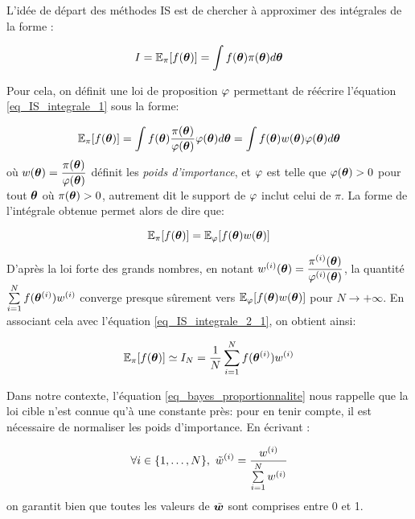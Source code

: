  L'idée de départ des méthodes IS est de chercher à approximer des intégrales de la forme : 
 
 \begin{equation}
  I = \mathbb{E}_\pi[f({\bm{\theta}})] = \int f({\bm{\theta}})\pi({\bm{\theta}})d{\bm{\theta}}
  \label{eq_IS_integrale_1}
 \end{equation}
 
 Pour cela, on définit une loi de proposition ${\varphi}$ permettant de réécrire l'équation \eqref{eq_IS_integrale_1} sous la forme:
 
 \begin{equation}
\mathbb{E}_\pi[f({\bm{\theta}})] = \int  f({\bm{\theta}}) \dfrac{\pi({\bm{\theta}})}{{\varphi}({\bm{\theta}})}{\varphi}({\bm{\theta}})d{\bm{\theta}} = \int  f({\bm{\theta}}) w({\bm{\theta}}) {\varphi}({\bm{\theta}})d{\bm{\theta}} 
\label{eq_IS_integrale_2}
 \end{equation}
 où $w({\bm{\theta}}) = \dfrac{\pi({\bm{\theta}})}{{\varphi}({\bm{\theta}})}$ {définit les \textit{poids d'importance}, et ${\varphi}$ est telle que ${\varphi}({\bm{\theta}}) >0 $ pour tout ${\bm{\theta}}$ où $\pi({\bm{\theta}}) > 0$, autrement dit le support de ${\varphi}$ inclut celui de $\pi$. } La forme de l'intégrale obtenue permet alors de dire que:
 
\begin{equation}
\mathbb{E}_\pi[f({\bm{\theta}})] = \mathbb{E}_{\varphi}[f({\bm{\theta}})w({\bm{\theta}})] 
\label{eq_IS_integrale_2_1}
\end{equation}

D'après la loi forte des grands nombres, {en notant $w^{(i)}({\bm{\theta}}) = \dfrac{\pi^{(i)}({\bm{\theta}})}{{\varphi}^{(i)}({\bm{\theta}})}$, la quantité} $\sum\limits_{i=1}^N f({\bm{\theta}}^{(i)}) w^{(i)}$ converge presque sûrement vers  $\mathbb{E}_\varphi[f({\bm{\theta}})w({\bm{\theta}})]$ pour $N \rightarrow + \infty$. En associant cela avec l'équation \eqref{eq_IS_integrale_2_1}, on obtient ainsi:
 
 \begin{equation}
 \mathbb{E}_\pi[f({\bm{\theta}})] \simeq I_N = \dfrac{1}{N}\sum\limits_{i=1}^N f({\bm{\theta}}^{(i)})  w^{(i)}
 \label{eq_IS_integrale_3}
 \end{equation}
 
 Dans notre contexte, l'équation \eqref{eq_bayes_proportionnalite} nous rappelle que la loi cible n'est connue qu'à une constante près: pour en tenir compte, il est nécessaire de normaliser les poids d'importance. En écrivant : 
 
 \begin{equation}
 \forall i \in \{1, \dots, N\}, ~ {\tilde{w}}^{(i)} = \dfrac{w^{(i)}}{\sum\limits_{i=1}^N w^{(i)}}
 \label{eq_IS_poids_normalises}
 \end{equation}
 on garantit bien que toutes les valeurs de ${\tilde{\bm{w}}}$ sont comprises entre 0 et 1. \\
 
